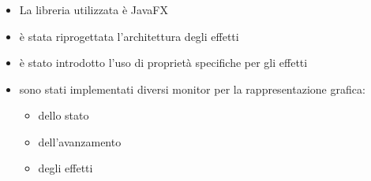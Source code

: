 \documentclass[%
]{beamer}
\begin{document}
            \begin{frame}
                \frametitle{\insertsection}
                \framesubtitle{\insertsubsection}
                \begin{columns}[onlytextwidth]
                    \begin{column}{.4\textwidth}
                    \begin{itemize}
                        \item<1->
                            La libreria utilizzata è JavaFX
                        \item<2->
                            è stata riprogettata l'architettura degli effetti
                        \item<3->
                            è stato introdotto l'uso di proprietà specifiche per gli effetti
                        \item<4->
                            sono stati implementati diversi monitor per la rappresentazione grafica:
                            \begin{itemize}
                              \item<5->
                                  dello stato
                              \item<6->
                                  dell'avanzamento
                              \item<7->
                                  degli effetti
                            \end{itemize}
                    \end{itemize}
                    \end{column}
                    \begin{column}{.6\textwidth}
                        \centering
\end{column}
\end{columns}
\end{frame}
\end{document}
